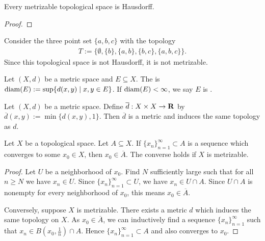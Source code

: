 \begin{proposition}
    Every metrizable topological space is Hausdorff.
\end{proposition}
    {\color{red} \begin{proof}
        
    \end{proof}}

\begin{example}
    Consider the three point set $\{a,b,c\}$ with the topology 
        \begin{equation*}
        \begin{split}
            T:=\{\emptyset, \{b\}, \{a,b\}, \{b,c\}, \{a,b,c\}\}.
        \end{split}
        \end{equation*}
    Since this topological space is not Hausdorff, it is not metrizable.
\end{example}

\begin{definition}
    Let $(X,d)$ be a metric space and $E \subseteq X$. The  is $\operatorname{diam}(E) := \sup\{d(x,y) \mid x,y \in E\}$. If $\operatorname{diam}(E) < \infty$, we say $E$ is .
\end{definition}

\begin{proposition}
    Let $(X,d)$ be a metric space. Define $\overline{d}:X \times X \rightarrow \mathbf{R}$ by $\overline{d}(x,y):= \min\{d(x,y),1\}$. Then $\overline{d}$ is a metric and induces the same topology as $d$.
\end{proposition}

\begin{theorem}
    Let $X$ be a topological space. Let $A \subseteq X$. If $\{x_n\}_{n = 1}^\infty \subset A$ is a sequence which converges to some $x_0 \in X$, then $x_0 \in \overline{A}$. The converse holds if $X$ is metrizable.
\end{theorem}
    \begin{proof}
        Let $U$ be a neighborhood of $x_0$. Find $N$ sufficiently large such that for all $n \geq N$ we have $x_n \in U$. Since $\{x_n\}_{n = 1}^\infty \subset U$, we have $x_n \in U \cap A$. Since $U \cap A$ is nonempty for every neighborhood of $x_0$, this means $x_0 \in \overline{A}$.

        Conversely, suppose $X$ is metrizable. There exists a metric $d$ which induces the same topology on $X$. As $x_0 \in \overline{A}$, we can inductively find a sequence $\{x_n\}_{n = 1}^\infty$ such that $x_n \in B(x_0, \frac{1}{n}) \cap A$. Hence $\{x_n\}_{n = 1}^\infty \subset A$ and also converges to $x_0$.
    \end{proof}

